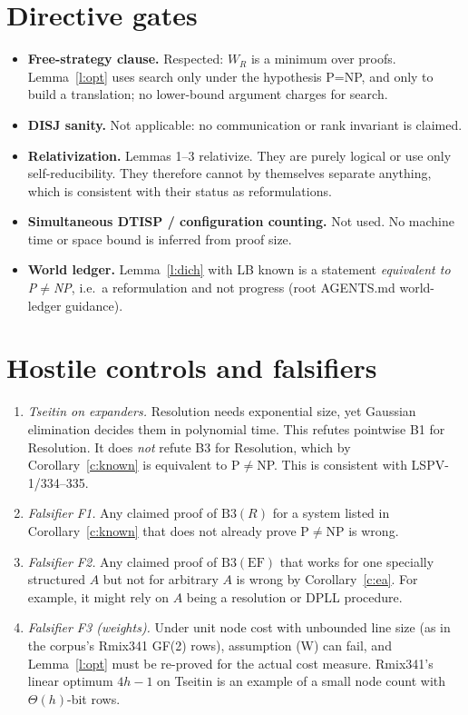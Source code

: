\documentclass[11pt]{article}
\theoremstyle{definition}
\begin{document}
\section{Directive gates}
\begin{itemize}
\item \textbf{Free-strategy clause.} Respected: $W_R$ is a minimum over proofs.
Lemma~\ref{l:opt} uses search only under the hypothesis P=NP, and only to build
a translation; no lower-bound argument charges for search.
\item \textbf{DISJ sanity.} Not applicable: no communication or rank invariant is claimed.
\item \textbf{Relativization.} Lemmas 1--3 relativize. They are purely logical
or use only self-reducibility. They therefore cannot by themselves separate
anything, which is consistent with their status as reformulations.
\item \textbf{Simultaneous DTISP / configuration counting.} Not used. No
machine time or space bound is inferred from proof size.
\item \textbf{World ledger.} Lemma~\ref{l:dich} with LB known is a statement
\emph{equivalent to P$\ne$NP}, i.e.\ a reformulation and not progress
(root AGENTS.md world-ledger guidance).
\end{itemize}

\section{Hostile controls and falsifiers}
\begin{enumerate}
\item \emph{Tseitin on expanders.} Resolution needs exponential size, yet
Gaussian elimination decides them in polynomial time. This refutes pointwise
B1 for Resolution. It does \emph{not} refute B3 for Resolution, which by
Corollary~\ref{c:known} is equivalent to P$\ne$NP. This is consistent with
LSPV-1/334--335.
\item \emph{Falsifier F1.} Any claimed proof of $\mathrm{B3}(R)$ for a system
listed in Corollary~\ref{c:known} that does not already prove P$\ne$NP is wrong.
\item \emph{Falsifier F2.} Any claimed proof of $\mathrm{B3}(\mathrm{EF})$ that
works for one specially structured $A$ but not for arbitrary $A$ is wrong by
Corollary~\ref{c:ea}. For example, it might rely on $A$ being a resolution or
DPLL procedure.
\item \emph{Falsifier F3 (weights).} Under unit node cost with unbounded line
size (as in the corpus's Rmix341 GF(2) rows), assumption (W) can fail, and
Lemma~\ref{l:opt} must be re-proved for the actual cost measure. Rmix341's
linear optimum $4h-1$ on Tseitin is an example of a small node count with
$\Theta(h)$-bit rows.
\end{enumerate}
\end{document}
